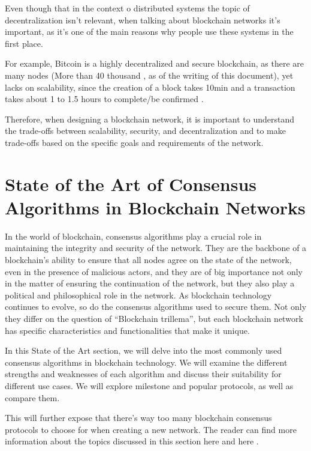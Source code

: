Even though that in the context o distributed systems the topic of decentralization isn't relevant, when talking about blockchain networks it's important, as it's one of the main reasons why people use these systems in the first place.

For example, Bitcoin is a highly decentralized and secure blockchain, as there are many nodes (More than 40 thousand  \cite{bitnodes}, as of the writing of this document), yet lacks on scalability, since the creation of a block takes 10min and a transaction takes about 1 to 1.5 hours to complete/be confirmed \cite{gondek}\label{exampleoftime}.

Therefore, when designing a blockchain network, it is important to understand the trade-offs between scalability, security, and decentralization and to make trade-offs based on the specific goals and requirements of the network.



\section{State of the Art of Consensus Algorithms in Blockchain Networks}
\label{stateoftheart}

In the world of blockchain, consensus algorithms play a crucial role in maintaining the integrity and security of the network. They are the backbone of a blockchain's ability to ensure that all nodes agree on the state of the network, even in the presence of malicious actors, and they are of big importance not only in the matter of ensuring the continuation of the network, but they also play a political and philosophical role in the network.
As blockchain technology continues to evolve, so do the consensus algorithms used to secure them.
Not only they differ on the question of ``Blockchain trillema'', but each blockchain network has specific characteristics and functionalities that make it unique.

In this State of the Art section, we will delve into the most commonly used consensus algorithms in blockchain technology. We will examine the different strengths and weaknesses of each algorithm and discuss their suitability for different use cases. We will explore milestone and popular protocols, as well as compare them.

This will further expose that there's way too many blockchain consensus protocols to choose for when creating a new network.
The reader can find more information about the topics discussed in this section here \cite{xu2023survey} and here \cite{ferdous2020blockchain}.


